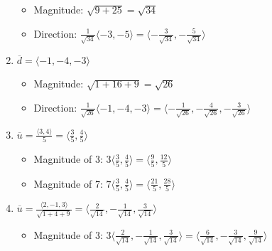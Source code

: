 \begin{enumerate}
    \begin{itemize}

      \item Magnitude: $\sqrt{9 + 25} = \sqrt{34}$

      \item Direction: $\frac{1}{\sqrt{34}}\langle -3, -5 \rangle=\langle -\frac{3}{\sqrt{34}}, -\frac{5}{\sqrt{34}} \rangle$

    \end{itemize}

    \setcounter{enumi}{28}

  \item $\overline{d} = \langle -1, -4, -3 \rangle$

    \begin{itemize}

      \item Magnitude: $\sqrt{1 + 16 + 9} = \sqrt{26}$

      \item Direction: $\frac{1}{\sqrt{26}}\langle -1, -4, -3 \rangle = \langle -\frac{1}{\sqrt{26}}, -\frac{4}{\sqrt{26}}, -\frac{3}{\sqrt{26}} \rangle$

     \end{itemize}

    \setcounter{enumi}{32}

  \item $\overline{u} = \frac{\langle 3, 4 \rangle}{5} = \langle \frac{3}{5}, \frac{4}{5} \rangle$

    \begin{itemize}

      \item Magnitude of 3: $3\langle \frac{3}{5}, \frac{4}{5} \rangle = \langle \frac{9}{5}, \frac{12}{5} \rangle$

      \item Magnitude of 7: $7\langle \frac{3}{5}, \frac{4}{5} \rangle = \langle \frac{21}{5}, \frac{28}{5} \rangle$

    \end{itemize}

    \setcounter{enumi}{35}

  \item $\overline{u} = \frac{\langle 2, -1, 3 \rangle}{\sqrt{1 + 4 + 9}} = \langle \frac{2}{\sqrt{14}}, -\frac{1}{\sqrt{14}}, \frac{3}{\sqrt{14}}\rangle$

    \begin{itemize}

      \item Magnitude of 3: $3\langle \frac{2}{\sqrt{14}}, -\frac{1}{\sqrt{14}}, \frac{3}{\sqrt{14}} \rangle = \langle \frac{6}{\sqrt{14}}, -\frac{3}{\sqrt{14}}, \frac{9}{\sqrt{14}} \rangle$


\end{itemize}
\end{enumerate}
